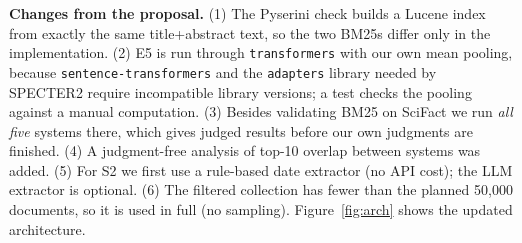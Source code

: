 \documentclass[10pt,a4paper]{article}
\begin{document}
\textbf{Changes from the proposal.}
(1) The Pyserini check builds a Lucene index from exactly the same title+abstract text, so the
two BM25s differ only in the implementation.
(2) E5 is run through \texttt{transformers} with our own mean pooling, because
\texttt{sentence-transformers} and the \texttt{adapters} library needed by SPECTER2 require
incompatible library versions; a test checks the pooling against a manual computation.
(3) Besides validating BM25 on SciFact we run \emph{all five} systems there, which gives
judged results before our own judgments are finished.
(4) A judgment-free analysis of top-10 overlap between systems was added.
(5) For S2 we first use a rule-based date extractor (no API cost); the LLM extractor is optional.
(6) The filtered collection has fewer than the planned 50{,}000 documents, so it is used in full (no sampling).
Figure~\ref{fig:arch} shows the updated architecture.
\end{document}
